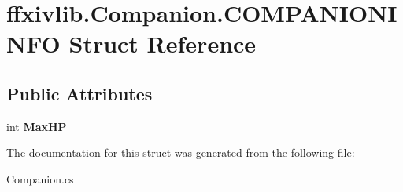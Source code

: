 \hypertarget{structffxivlib_1_1_companion_1_1_c_o_m_p_a_n_i_o_n_i_n_f_o}{\section{ffxivlib.\-Companion.\-C\-O\-M\-P\-A\-N\-I\-O\-N\-I\-N\-F\-O Struct Reference}
\label{structffxivlib_1_1_companion_1_1_c_o_m_p_a_n_i_o_n_i_n_f_o}
}
\subsection*{Public Attributes}
\begin{DoxyCompactItemize}
\item 
\hypertarget{structffxivlib_1_1_companion_1_1_c_o_m_p_a_n_i_o_n_i_n_f_o_aecff8dbd0e251c1aee0a47b0bfd942f5}{int {\bfseries Max\-H\-P}}\label{structffxivlib_1_1_companion_1_1_c_o_m_p_a_n_i_o_n_i_n_f_o_aecff8dbd0e251c1aee0a47b0bfd942f5}

\end{DoxyCompactItemize}


The documentation for this struct was generated from the following file\-:\begin{DoxyCompactItemize}
\item 
Companion.\-cs\end{DoxyCompactItemize}
